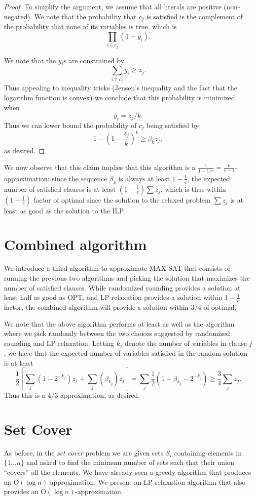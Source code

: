 \documentclass{article}
\begin{document}
\begin{proof}
To simplify the argument, we assume that all literals are positive (non-negated).  We note that the probability that $c_j$ is satisfied is the complement of the probability that none of its variables is true, which is $$\prod_{i\in c_j}(1-y_i).$$

We note that the $y_i$s are constrained by $$\sum_{i\in c_j} y_i\geq z_j.$$  Thus appealing to inequality tricks (Jensen's inequality and the fact that the logarithm function is convex) we conclude that this probability is minimized when $$y_i=z_j/k.$$
Thus we can lower bound the probability of $c_j$ being satisfied by $$1-(1-\frac{z_j}{k})^k\geq\beta_kz_j,$$ as desired.
\end{proof}

We now observe that this claim implies that this algorithm is a $\frac{1}{1-1/e}=\frac{e}{e-1}$-approximation: since the sequence $\beta_k$ is always at least $1-\frac{1}{e}$, the expected number of satisfied clauses is at least $(1-\frac{1}{e})\sum z_j$, which is thus within $(1-\frac{1}{e})$ factor of optimal since the solution to the relaxed problem $\sum z_j$ is at least as good as the solution to the ILP.

\section{Combined algorithm}
We introduce a third algorithm to approximate MAX-SAT that consists of running the previous two algorithms and picking the solution that maximizes the number of satisfied clauses.  While randomized rounding provides a solution at least half as good as OPT, and LP relaxation provides a solution within $1-\frac{1}{e}$ factor, the combined algorithm will provide a solution within $3/4$ of optimal.

We note that the above algorithm performs at least as well as the algorithm where we pick randomly between the two choices suggested by randomized rounding and LP relaxation.  Letting $k_j$ denote the number of variables in clause $j$, we have that the expected number of variables satisfied in the random solution is at least $$\frac{1}{2}\left[\sum_j(1-2^{-k_j})z_j+\sum_j(\beta_{k_j})z_j\right]=\sum_j \frac{1}{2}(1+\beta_{k_j}-2^{-k_j})\geq \frac{3}{4}\sum_j z_j.$$
Thus this is a $4/3$-approximation, as desired.

\section{Set Cover}
As before, in the \emph{set cover} problem we are given sets $S_i$ containing elements in $\{1...n\}$ and asked to find the minimum number of sets such that their union ``covers'' all the elements.  We have already seen a greedy algorithm that produces an $\textrm{O}(\log n)$-approximation.  We present an LP relaxation algorithm that also provides an $\textrm{O}(\log n)$-approximation.
\end{document}
